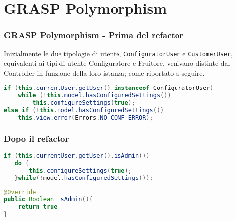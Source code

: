 \section{GRASP Polymorphism}
\begin{frame}[fragile]
    \frametitle{GRASP Polymorphism - Prima del refactor}

    Inizialmente le due tipologie di utente, \texttt{ConfiguratorUser} e \texttt{CustomerUser}, equivalenti ai tipi di utente Configuratore e Fruitore, venivano distinte dal Controller in funzione della loro istanza; come riportato a seguire.

    \lstset{style=java}
    \begin{lstlisting}[language=java, caption={v5 commit 34c1a67}]
if (this.currentUser.getUser() instanceof ConfiguratorUser)
    while (!this.model.hasConfiguredSettings())
        this.configureSettings(true);
else if (!this.model.hasConfiguredSettings())
    this.view.error(Errors.NO_CONF_ERROR);
    \end{lstlisting}

\end{frame}

\begin{frame}[fragile]
    \frametitle{Dopo il refactor}

    \begin{minipage}{.38\textwidth}
        \begin{figure}
            \centering
        \end{figure}
    \end{minipage}
    \hfill
    \begin{minipage}{.58\textwidth}
        \lstset{style=java}
        \begin{lstlisting}[language=java, caption={Codice refactorato in Controller}]
if (this.currentUser.getUser().isAdmin())
   do {
       this.configureSettings(true);
   }while(!model.hasConfiguredSettings());
        \end{lstlisting}

        \begin{lstlisting}[language=java, caption={Utente configuratore è admin}]
@Override
public Boolean isAdmin(){
    return true;
}
        \end{lstlisting}
    \end{minipage}

\end{frame}